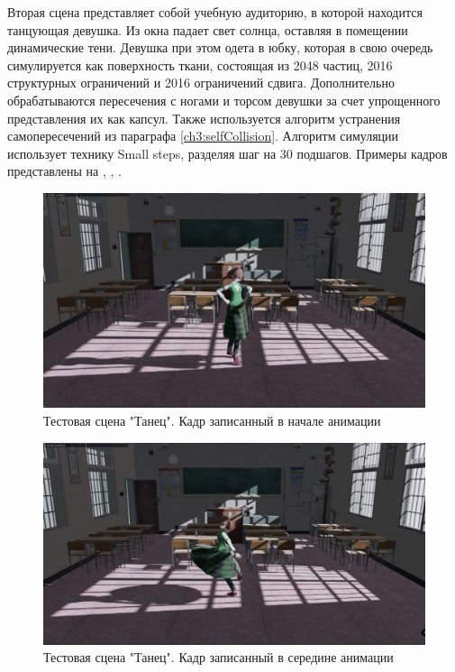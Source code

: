 	\FloatBarrier
	
	Вторая сцена представляет собой учебную аудиторию, в которой находится танцующая девушка. Из окна падает свет солнца, оставляя в помещении динамические тени. Девушка при этом одета в юбку, которая в свою очередь симулируется как поверхность ткани, состоящая из 2048 частиц, 2016 структурных ограничений и 2016 ограничений сдвига. Дополнительно обрабатываются пересечения с ногами и торсом девушки за счет упрощенного представления их как капсул. Также используется алгоритм устранения самопересечений из параграфа \ref{ch3:selfCollision}. Алгоритм симуляции использует технику Small steps, разделяя шаг на 30 подшагов. Примеры кадров представлены на , , .
	
	\begin{figure}[ht!] 
		\center
		\includegraphics [scale=0.35] {my_folder/images//dance1}	
		\caption{Тестовая сцена "Танец". Кадр записанный в начале анимации} 
		\label{fig:dance1}
	\end{figure}

	\begin{figure}[ht!] 
		\center
		\includegraphics [scale=0.35] {my_folder/images//dance2}	
		\caption{Тестовая сцена "Танец". Кадр записанный в середине анимации} 
		\label{fig:dance2}
	\end{figure}

